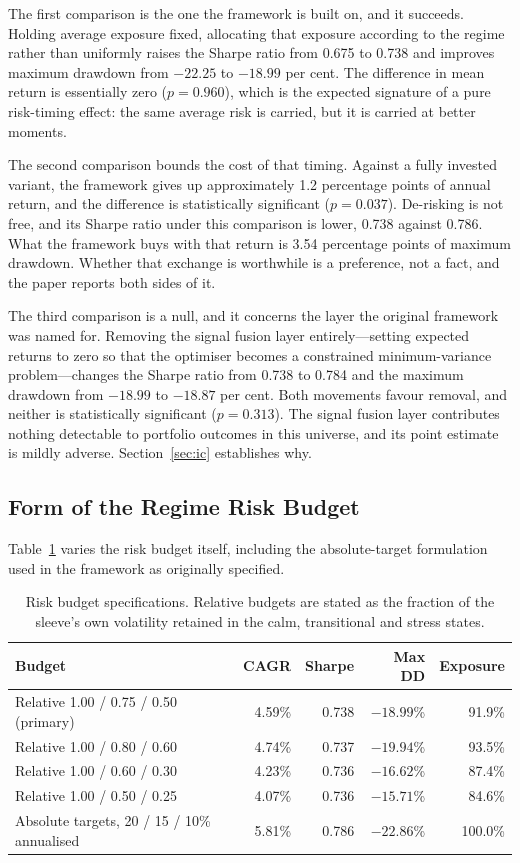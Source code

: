 \documentclass{singlecol-new}
\theoremstyle{TH}{
\newtheorem{lemma}{Lemma}
\newtheorem{theorem}[lemma]{Theorem}
\newtheorem{corrolary}[lemma]{Corrolary}
\newtheorem{conjecture}[lemma]{Conjecture}
\newtheorem{proposition}[lemma]{Proposition}
\newtheorem{claim}[lemma]{Claim}
\newtheorem{stheorem}[lemma]{Wrong Theorem}
\newtheorem{algorithm}{Algorithm}
}
\theoremstyle{THrm}{
\newtheorem{definition}{Definition}[section]
\newtheorem{question}{Question}[section]
\newtheorem{remark}{Remark}
\newtheorem{scheme}{Scheme}
}
\theoremstyle{THhit}{
\newtheorem{case}{Case}[section]
}
\begin{document}
The first comparison is the one the framework is built on, and it succeeds. Holding
average exposure fixed, allocating that exposure according to the regime rather than
uniformly raises the Sharpe ratio from 0.675 to 0.738 and improves maximum drawdown
from $-22.25$ to $-18.99$ per cent. The difference in mean return is essentially zero
($p = 0.960$), which is the expected signature of a pure risk-timing effect: the same
average risk is carried, but it is carried at better moments.

The second comparison bounds the cost of that timing. Against a fully invested variant,
the framework gives up approximately 1.2 percentage points of annual return, and the difference is
statistically significant ($p = 0.037$). De-risking is not free, and its Sharpe ratio
under this comparison is lower, 0.738 against 0.786. What the framework buys with that
return is 3.54 percentage points of maximum drawdown. Whether that exchange is
worthwhile is a preference, not a fact, and the paper reports both sides of it.

The third comparison is a null, and it concerns the layer the original framework was
named for. Removing the signal fusion layer entirely---setting expected returns to
zero so that the optimiser becomes a constrained minimum-variance problem---changes the
Sharpe ratio from 0.738 to 0.784 and the maximum drawdown from $-18.99$ to $-18.87$ per
cent. Both movements favour removal, and neither is statistically significant
($p = 0.313$). The signal fusion layer contributes nothing detectable to portfolio
outcomes in this universe, and its point estimate is mildly adverse.
Section~\ref{sec:ic} establishes why.

\subsection{Form of the Regime Risk Budget}

Table~\ref{tab:budget} varies the risk budget itself, including the absolute-target formulation used
in the framework as originally specified.

\begin{table}[!ht]
\centering
\caption{Risk budget specifications. Relative budgets are stated as the fraction of the
sleeve's own volatility retained in the calm, transitional and stress states.}
\label{tab:budget}
\small
\begin{tabular}{p{4.6cm}rrrr}
\hline
\textbf{Budget} & \textbf{CAGR} & \textbf{Sharpe} & \textbf{Max DD} & \textbf{Exposure} \\
\hline
Relative 1.00 / 0.75 / 0.50 (primary) & 4.59\% & 0.738 & $-18.99$\% & 91.9\% \\
Relative 1.00 / 0.80 / 0.60 & 4.74\% & 0.737 & $-19.94$\% & 93.5\% \\
Relative 1.00 / 0.60 / 0.30 & 4.23\% & 0.736 & $-16.62$\% & 87.4\% \\
Relative 1.00 / 0.50 / 0.25 & 4.07\% & 0.736 & $-15.71$\% & 84.6\% \\
Absolute targets, 20 / 15 / 10\% annualised & 5.81\% & 0.786 & $-22.86$\% & 100.0\% \\
\hline
\end{tabular}
\end{table}
\end{document}
